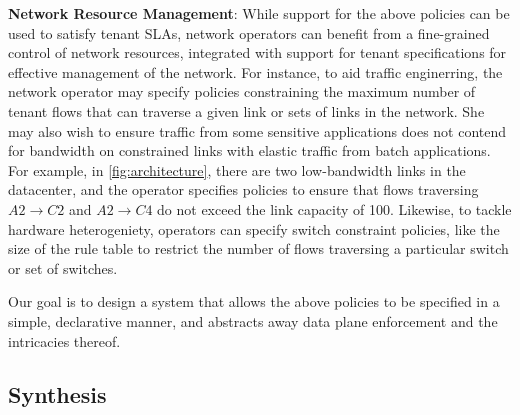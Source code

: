 \textbf{Network Resource Management}: While support for the above
policies can be used to satisfy tenant SLAs, network operators can
benefit from a fine-grained control of network resources, integrated
with support for tenant specifications for effective management of the
network. For instance, to aid traffic enginerring, the network
operator may specify policies constraining the maximum number of
tenant flows that can traverse a given link or sets of links in the
network. She may also wish to ensure traffic from some sensitive
applications does not contend for bandwidth on constrained links with
elastic traffic from batch applications. For example, in \cref{fig:architecture},
there are two low-bandwidth links in the datacenter, and the operator
specifies policies to ensure that flows traversing $A2 \rightarrow C2$ 
and $A2 \rightarrow C4$ do not exceed the link capacity of 100.
  Likewise, to tackle hardware heterogeniety, operators can specify
  switch constraint policies, like the size of the rule table to
  restrict the number of flows traversing a particular switch or set
  of switches.

  Our goal is to design a system that allows the above policies to be
  specified in a simple, declarative manner, and abstracts away 
  data plane enforcement and the intricacies thereof.
  
\subsection{Synthesis} \label{sec:synthesis} 

